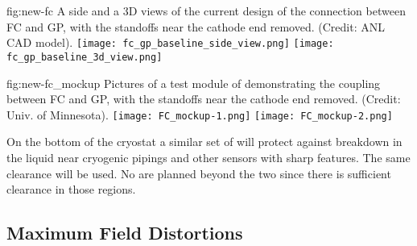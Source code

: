 \begin{dunefigure}
{fig:new-fc}
{A side and a 3D views of the current design of the connection between FC and GP, with the standoffs near the cathode end removed. (Credit: ANL CAD model).}%
\texttt{[image: fc\_gp\_baseline\_side\_view.png]}
\texttt{[image: fc\_gp\_baseline\_3d\_view.png]}
\end{dunefigure}

\begin{dunefigure}
{fig:new-fc_mockup}
{Pictures of a test module of demonstrating the coupling between FC and GP, with the standoffs near the cathode end removed. (Credit: Univ. of Minnesota).}%
\texttt{[image: FC\_mockup-1.png]}
\texttt{[image: FC\_mockup-2.png]}
\end{dunefigure}



On the bottom of the cryostat a similar set of  %
will protect against %
breakdown in the liquid near cryogenic pipings and other sensors with sharp features. The same clearance will be used. No  are planned beyond the two  since there is sufficient clearance in those regions.  





\subsection{Maximum Field Distortions}

